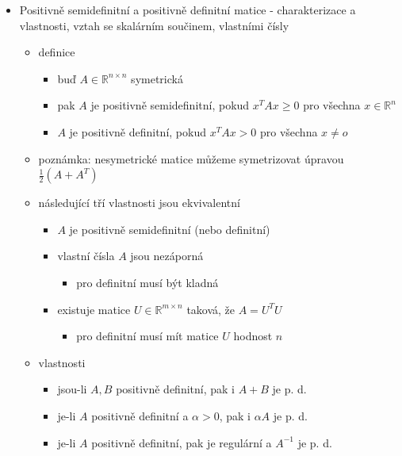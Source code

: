 \begin{itemize}
\begin{itemize}
\item matice je symetrická, pokud $A=A^T$
\item vlastní čísla reálných symetrických matic jsou reálná
\item věta: pro každou symetrickou matici $A\in\mathbb R^{n\times n}$ existuje ortogonální $Q\in\mathbb R^{n\times n}$ a diagonální $\Lambda\in\mathbb R^{n\times n}$ takové, že $A=Q\Lambda Q^T$
\end{itemize}
\item Positivně semidefinitní a positivně definitní matice - charakterizace a vlastnosti, vztah se skalárním součinem, vlastními čísly
\begin{itemize}
\item definice
\begin{itemize}
\item buď $A\in\mathbb R^{n\times n}$ symetrická
\item pak $A$ je positivně semidefinitní, pokud $x^TAx\geq 0$ pro všechna $x\in\mathbb R^n$
\item $A$ je positivně definitní, pokud $x^TAx\gt 0$ pro všechna $x\neq o$
\end{itemize}
\item poznámka: nesymetrické matice můžeme symetrizovat úpravou $\frac12(A+A^T)$
\item následující tří vlastnosti jsou ekvivalentní
\begin{itemize}
\item $A$ je positivně semidefinitní (nebo definitní)
\item vlastní čísla $A$ jsou nezáporná
\begin{itemize}
\item pro definitní musí být kladná
\end{itemize}
\item existuje matice $U\in\mathbb R^{m\times n}$ taková, že $A=U^TU$
\begin{itemize}
\item pro definitní musí mít matice $U$ hodnost $n$
\end{itemize}
\end{itemize}
\item vlastnosti
\begin{itemize}
\item jsou-li $A,B$ positivně definitní, pak i $A+B$ je p. d.
\item je-li $A$ positivně definitní a $\alpha\gt 0$, pak i $\alpha A$ je p. d.
\item je-li $A$ positivně definitní, pak je regulární a $A^{-1}$ je p. d.

\end{itemize}
\end{itemize}
\end{itemize}
